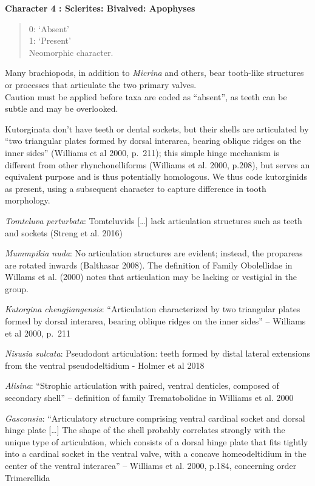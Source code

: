 \documentclass[]{book}
\theoremstyle{definition}
\theoremstyle{definition}
\theoremstyle{definition}
\theoremstyle{remark}
\begin{document}
\textbf{Character 4 : Sclerites: Bivalved: Apophyses }

\begin{quote}
0: `Absent'\\
1: `Present'\\
Neomorphic character.
\end{quote}

Many brachiopods, in addition to \emph{Micrina} and others, bear
tooth-like structures or processes that articulate the two primary
valves.\\
Caution must be applied before taxa are coded as ``absent'', as teeth
can be subtle and may be overlooked.

Kutorginata don't have teeth or dental sockets, but their shells are
articulated by ``two triangular plates formed by dorsal interarea,
bearing oblique ridges on the inner sides'' (Williams et al 2000,
p.~211); this simple hinge mechanism is different from other
rhynchonelliforms (Williams et al. 2000, p.208), but serves an
equivalent purpose and is thus potentially homologous. We thus code
kutorginids as present, using a subsequent character to capture
difference in tooth morphology.

\emph{Tomteluva perturbata}: Tomteluvids {[}\ldots{}{]} lack
articulation structures such as teeth and sockets (Streng et al. 2016)

\emph{Mummpikia nuda}: No articulation structures are evident; instead,
the propareas are rotated inwards (Balthasar 2008). The definition of
Family Obolellidae in Willams et al. (2000) notes that articulation may
be lacking or vestigial in the group.

\emph{Kutorgina chengjiangensis}: ``Articulation characterized by two
triangular plates formed by dorsal interarea, bearing oblique ridges on
the inner sides'' -- Williams et al 2000, p.~211

\emph{Nisusia sulcata}: Pseudodont articulation: teeth formed by distal
lateral extensions from the ventral pseudodeltidium - Holmer et al 2018

\emph{Alisina}: ``Strophic articulation with paired, ventral denticles,
composed of secondary shell'' -- definition of family Trematobolidae in
Williams et al. 2000

\emph{Gasconsia}: ``Articulatory structure comprising ventral cardinal
socket and dorsal hinge plate {[}\ldots{}{]} The shape of the shell
probably correlates strongly with the unique type of articulation, which
consists of a dorsal hinge plate that fits tightly into a cardinal
socket in the ventral valve, with a concave homeodeltidium in the center
of the ventral interarea'' -- Williams et al. 2000, p.184, concerning
order Trimerellida
\end{document}
